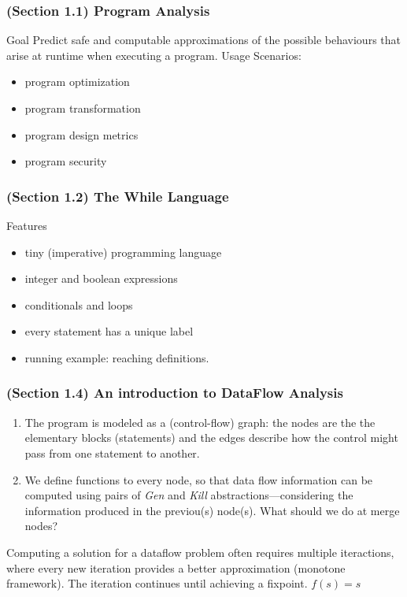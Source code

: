 \begin{frame}
  \frametitle{(Section 1.1) Program Analysis}

  \begin{block}{Goal}
    Predict {\color{blue}safe} and {\color{blue}computable approximations} of the possible
    behaviours that arise at runtime when executing a program. \pause
    Usage Scenarios:
    \begin{itemize}
     \item program optimization
     \item program transformation
     \item program design metrics
     \item program security
    \end{itemize}
  \end{block}
\end{frame}

\begin{frame}
  \frametitle{(Section 1.2) The While Language}

  \begin{block}{Features}
    \begin{itemize}
     \item tiny (imperative) programming language
     \item integer and boolean expressions  
     \item conditionals and loops \pause
     \item every statement has a unique label  
    \end{itemize}
  \end{block}

  \begin{itemize}
    \item running example: reaching definitions. 
  \end{itemize}
\end{frame}

\begin{frame}
  \frametitle{(Section 1.4) An introduction to DataFlow Analysis}

  \begin{enumerate}
    \item The program is modeled as a (control-flow) graph: the nodes are the
  the elementary blocks (statements) and the edges describe how the
  control might pass from one statement to another.

    \item We define functions to every node, so that data flow information
      can be computed using pairs of \emph{Gen} and \emph{Kill} abstractions---considering the
      information produced in the previou(s) node(s). What should we do
      at merge nodes?
  \end{enumerate}

  \pause Computing a solution for a dataflow problem often
  requires multiple iteractions, where every new iteration
  provides a better approximation (monotone framework).
  The iteration continues until achieving a {\color{blue}fixpoint}.
  \pause $f(s) = s$
  
\end{frame}

